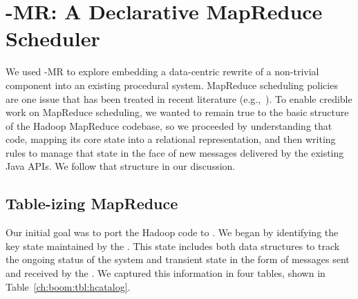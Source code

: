 \section{\BOOM-MR: A Declarative MapReduce Scheduler}
\label{ch:boom:sec:port}

We used \BOOM-MR to explore embedding a data-centric rewrite of a non-trivial
component into an existing procedural system.  MapReduce scheduling policies
are one issue that has been treated in recent literature
(e.g.,~\cite{zaharia-late,delay-sched}).  To enable credible work on MapReduce
scheduling, we wanted to remain true to the basic structure of the Hadoop
MapReduce codebase, so we proceeded by understanding that code, mapping its
core state into a relational representation, and then writing \OVERLOG rules to
manage that state in the face of new messages delivered by the existing Java
APIs.  We follow that structure in our discussion.



\subsection{Table-izing MapReduce}
\label{sec:mr-overlog}
Our initial goal was to port the Hadoop {\JT} code to \OVERLOG.  We began by identifying
the key state maintained by the {\JT}.  This state includes both data structures
to track the ongoing status of the system and transient state in the form of
messages sent and received by the {\JT}.  We captured this information in four
\OVERLOG tables, shown in Table~\ref{ch:boom:tbl:hcatalog}.

